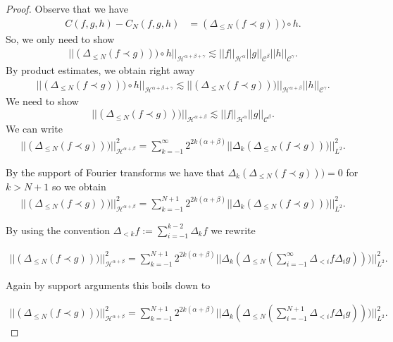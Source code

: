 \documentclass[11pt, oneside]{article}   	%
\newcommand{\CC}{\mathscr{C}}
\newcommand{\ssp}{\mathscr{H}}
\begin{document}
\begin{proof}
	Observe that we have
	\begin{align*}
	C (f, g, h) - C_N (f, g, h) &= \left(\Delta_{\leq N} (f\prec g)\right))\circ h.
	\end{align*}
	So, we only need to show
	\begin{align*}
	|| \left(\Delta_{\leq N} (f\prec g)\right))\circ h ||_{\ssp^{\alpha + \beta + \gamma}} \lesssim || f
	||_{\ssp^{\alpha}} || g ||_{\CC^{\beta}} || h
	||_{\CC^{\gamma}}.
	\end{align*}
	By product estimates, we obtain right away
	\begin{align*}
	|| \left(\Delta_{\leq N} (f\prec g)\right))\circ h ||_{\ssp^{\alpha + \beta + \gamma}} \lesssim || \left(\Delta_{\leq N} (f\prec g)\right))
	||_{\ssp^{\alpha+ \beta}} || h
	||_{\CC^{\gamma}}.
	\end{align*}
	We  need to show
	\[
	|| \left(\Delta_{\leq N} (f\prec g)\right))
	||_{\ssp^{\alpha+ \beta}} \lesssim || f
	||_{\ssp^{\alpha}} || g ||_{\CC^{\beta}}.
	\]
	We can write
	\begin{align*}
	|| \left(\Delta_{\leq N} (f\prec g)\right))
	||_{\ssp^{\alpha+ \beta}}^2 = \sum_{k=-1}^{\infty} 2^{2k(\alpha+\beta)} || \Delta_k \left(\Delta_{\leq N} (f\prec g)\right))||_{L^2}^2.
	\end{align*}
	
	By the support of Fourier transforms we have that $ \Delta_k \left(\Delta_{\leq N} (f\prec g)\right)) = 0$ for $k> N+1$ so we obtain
	\begin{align*}
	|| \left(\Delta_{\leq N} (f\prec g)\right))
	||_{\ssp^{\alpha+ \beta}}^2 = \sum_{k=-1}^{N+1} 2^{2k(\alpha+\beta)} || \Delta_k \left(\Delta_{\leq N} (f\prec g)\right))||_{L^2}^2.
	\end{align*}
	
	By using the convention $\Delta_{<k} f:= \sum_{i=-1}^{k-2} \Delta_k f$ we  rewrite
	
	\begin{align*}
	|| \left(\Delta_{\leq N} (f\prec g)\right))
	||_{\ssp^{\alpha+ \beta}}^2 = \sum_{k=-1}^{N+1} 2^{2k(\alpha+\beta)} || \Delta_k \left(\Delta_{\leq N} (\sum_{i=-1}^\infty \Delta_{<i} f \Delta_i g)\right))||_{L^2}^2.
	\end{align*}
	
	Again by support arguments this boils down to
	
	\begin{align*}
	|| \left(\Delta_{\leq N} (f\prec g)\right))
	||_{\ssp^{\alpha+ \beta}}^2 = \sum_{k=-1}^{N+1} 2^{2k(\alpha+\beta)} || \Delta_k \left(\Delta_{\leq N} (\sum_{i=-1}^{N+1} \Delta_{<i} f \Delta_i g)\right))||_{L^2}^2.
	\end{align*}
	

\end{proof}
\end{document}
